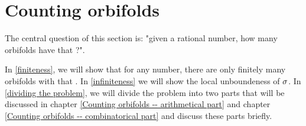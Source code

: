 \chapter{Counting orbifolds} \label{counting occurrences}

The central question of this section is: "given a rational number, how many orbifolds 
have that \Eoc ?". 

In \ref{finiteness}, we will show that for any number, there are only finitely many 
orbifolds with that \Eoc. 
In \ref{infiniteness} we will show the local unboundeness of ${\sigma}$. 
In \ref{dividing the problem}, we will divide the problem into two parts 
that will be discussed in chapter 
\ref{Counting orbifolds -- arithmetical part} and chapter 
\ref{Counting orbifolds -- combinatorical part} and discuss these parts briefly. 

